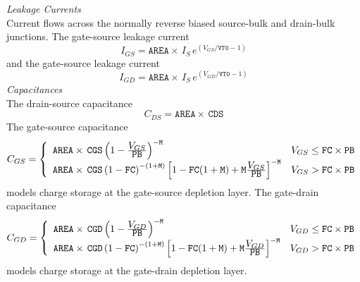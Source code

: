 \documentclass{article}
\begin{document}
\noindent \textit{Leakage Currents}\\
Current flows across the normally reverse biased source-bulk and
drain-bulk junctions. The gate-source leakage current
\begin{equation}
I_{GS} = \texttt{AREA} \times \, I_{S} \, e^{(\textstyle
V_{GS}/\texttt{VT0} -1)}
\end{equation}
and the gate-source leakage current
\begin{equation}
I_{GD} = \texttt{AREA} \times \, I_{S} \, e^{(\textstyle
V_{GD}/\texttt{VT0} -1)}
\end{equation}
\newline
\noindent \textit{Capacitances}\\
The drain-source capacitance
\begin{equation}
C_{DS} = \texttt{AREA} \times \, \texttt{CDS}
\end{equation}
The gate-source capacitance
\begin{equation}
C_{GS} = \left\{ \begin{array}{ll}
         \texttt{AREA} \times \,\texttt{CGS}\left(1 - {{\textstyle V_{GS}}\over{\textstyle \texttt{PB}}}
         \right)^{-\texttt{M}}
         & V_{GS} \le \texttt{FC} \times \texttt{PB}\\
         \texttt{AREA} \times \,\texttt{CGS}\left(1 -\texttt{FC}\right)^{-(1+\texttt{M})}
         \left[1-\texttt{FC}(1+\texttt{M})+\texttt{M} {{\textstyle V_{GS}}\over{\textstyle \texttt{PB}}}
         \right]^{-\texttt{M}}
         & V_{GS} > \texttt{FC} \times \texttt{PB}
         \end{array} \right. %
\end{equation}
models charge storage at the gate-source depletion layer. The
gate-drain capacitance
\begin{equation}
C_{GD} = \left\{ \begin{array}{ll}
         \texttt{AREA} \times \,\texttt{CGD}\left(1 - {{\textstyle V_{GD}}\over{\textstyle \texttt{PB}}}
         \right)^{-\texttt{M}}
         & V_{GD} \le \texttt{FC} \times \texttt{PB}\\
         \texttt{AREA} \times \,\texttt{CGD}\left(1 -\texttt{FC}\right)^{-(1+\texttt{M})}
         \left[1-\texttt{FC}(1+\texttt{M})+\texttt{M} {{\textstyle V_{GD}}\over{\textstyle \texttt{PB}}}
         \right]^{-\texttt{M}}
         & V_{GD} > \texttt{FC} \times \texttt{PB}
         \end{array} \right. %
\end{equation}
models charge storage at the gate-drain depletion layer.
\end{document}

